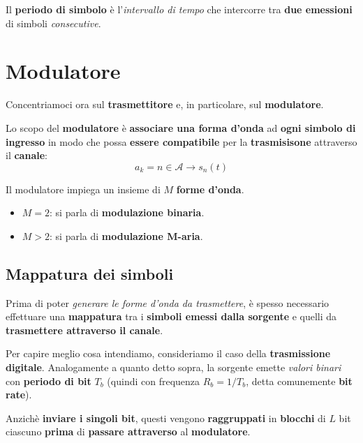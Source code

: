\begin{definition}
    Il \textbf{periodo di simbolo} è l'\textit{intervallo di tempo} che
    intercorre tra \textbf{due emessioni} di simboli \textit{consecutive}.
\end{definition}

\section{Modulatore}

Concentriamoci ora sul \textbf{trasmettitore} e, in particolare, sul
\textbf{modulatore}.

Lo scopo del \textbf{modulatore} è \textbf{associare una forma d'onda} 
ad \textbf{ogni simbolo di ingresso} in modo che possa \textbf{essere compatibile}
per la \textbf{trasmisisone} attraverso il \textbf{canale}:
\[
    a_k = n\in \mathcal{A} \longrightarrow s_n(t)
\]

\begin{definition}
    Il modulatore impiega un insieme di $M$ \textbf{forme d'onda}.
    \begin{itemize}
        \item $M=2$: si parla di \textbf{modulazione binaria}.
        \item $M>2$: si parla di \textbf{modulazione M-aria}.
    \end{itemize}
\end{definition}

\subsection{Mappatura dei simboli}

Prima di poter \textit{generare le forme d'onda da trasmettere}, è spesso 
necessario effettuare una \textbf{mappatura} tra i \textbf{simboli emessi dalla sorgente}
e quelli da \textbf{trasmettere attraverso il canale}.

Per capire meglio cosa intendiamo, consideriamo il caso della \textbf{trasmissione digitale}.
Analogamente a quanto detto sopra, la sorgente emette \textit{valori binari} 
con \textbf{periodo di bit} $T_b$ (quindi con frequenza $R_b = 1 /T_b$, detta 
comunemente \textbf{bit rate}). 

\begin{remark}
    Anzichè \textbf{inviare i singoli bit}, questi vengono
    \textbf{raggruppati} in \textbf{blocchi} di $L$ bit ciascuno
    \textbf{prima} di \textbf{passare attraverso} al \textbf{modulatore}.
\end{remark}

